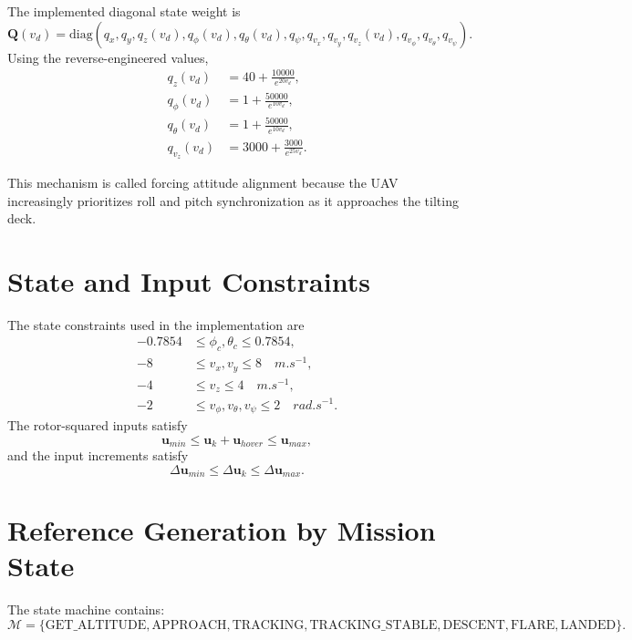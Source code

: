 \documentclass[12pt,a4paper]{article}
\begin{document}
The implemented diagonal state weight is
\begin{equation}
\bm{Q}(v_d)=\mathrm{diag}
\left(
q_x,q_y,q_z(v_d),q_{\phi}(v_d),q_{\theta}(v_d),q_{\psi},
q_{v_x},q_{v_y},q_{v_z}(v_d),q_{v_\phi},q_{v_\theta},q_{v_\psi}
\right).
\end{equation}
Using the reverse-engineered values,
\begin{align}
q_z(v_d)&=40+\frac{10000}{e^{20v_d}},\\
q_{\phi}(v_d)&=1+\frac{50000}{e^{10v_d}},\\
q_{\theta}(v_d)&=1+\frac{50000}{e^{10v_d}},\\
q_{v_z}(v_d)&=3000+\frac{3000}{e^{25v_d}}.
\end{align}

This mechanism is called forcing attitude alignment because the UAV increasingly prioritizes roll and pitch synchronization as it approaches the tilting deck.

\section{State and Input Constraints}

The state constraints used in the implementation are
\begin{align}
-0.7854 &\leq \phi_c,\theta_c \leq 0.7854,\\
-8 &\leq v_x,v_y \leq 8 \quad \si{m.s^{-1}},\\
-4 &\leq v_z \leq 4 \quad \si{m.s^{-1}},\\
-2 &\leq v_{\phi},v_{\theta},v_{\psi} \leq 2 \quad \si{rad.s^{-1}}.
\end{align}
The rotor-squared inputs satisfy
\begin{equation}
\bm{u}_{min}\leq \bm{u}_k+\bm{u}_{hover}\leq \bm{u}_{max},
\end{equation}
and the input increments satisfy
\begin{equation}
\Delta\bm{u}_{min}\leq \Delta\bm{u}_k\leq \Delta\bm{u}_{max}.
\end{equation}

\section{Reference Generation by Mission State}

The state machine contains:
\begin{equation}
\mathcal{M}=
\{\mathrm{GET\_ALTITUDE},\mathrm{APPROACH},\mathrm{TRACKING},
\mathrm{TRACKING\_STABLE},\mathrm{DESCENT},\mathrm{FLARE},\mathrm{LANDED}\}.
\end{equation}
\end{document}
